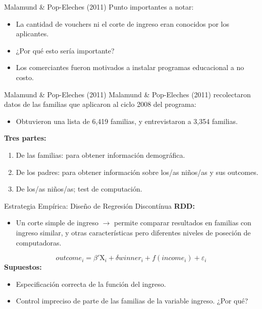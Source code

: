 \documentclass[11pt, aspectratio=169, compress]{beamer}
\begin{document}
\begin{frame}[t]{Malamund \& Pop-Eleches (2011)}
Punto importantes a notar: 
\begin{itemize}
	\item La cantidad de vouchers ni el corte de ingreso eran conocidos por los aplicantes. 
	\item ¿Por qué esto sería importante? 
	\item Los comerciantes fueron motivados a instalar programas educacional a no costo. 
\end{itemize}
\end{frame}
\begin{frame}[t]{Malamund \& Pop-Eleches (2011)} 
Malamund \& Pop-Eleches (2011) recolectaron datos de las familias que aplicaron al ciclo 2008 del programa:
\begin{itemize}
	\item Obtuvieron una lista de 6,419 familias, y entrevistaron a 3,354 familias.  
\end{itemize} 
\textbf{Tres partes: }
\begin{enumerate}
	\item De las familias: para obtener información demográfica. 
	\item De los padres: para obtener información sobre los/as niños/as y sus outcomes. 
	\item De los/as niños/as; test de computación.
\end{enumerate}
\end{frame}
\begin{frame}[t]{Estrategia Empírica: Diseño de Regresión Discontínua}
\textbf{RDD:} 
\begin{itemize}
	\item Un corte simple de ingreso $ \rightarrow $ permite comparar resultados en familias con ingreso similar, y otras características pero diferentes niveles de poseción de computadoras. 
\end{itemize}
\begin{equation}
	outcome_i = \beta' \mathrm{X}_i + \delta winner_i + f(income_i) + \varepsilon_i 
\end{equation}
\textbf{Supuestos: }
\begin{itemize}
	\item Especificación correcta de la función del ingreso. 
	\item Control impreciso de parte de las familias de la variable ingreso. ¿Por qué?  
\end{itemize}
\end{frame}
\end{document}
